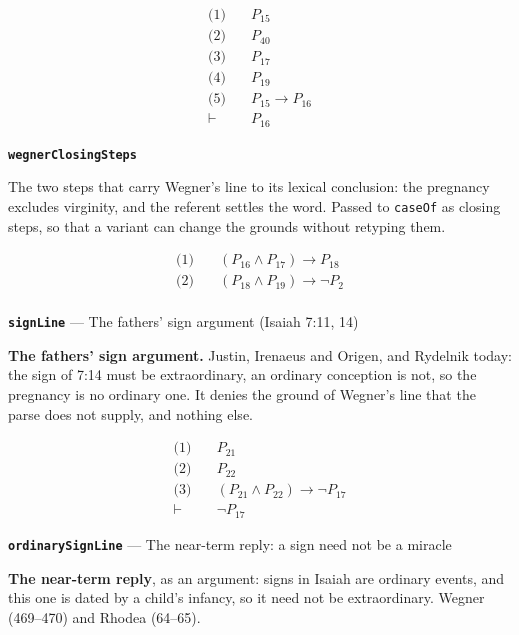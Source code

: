 \documentclass[11pt]{article}
\begin{document}
\begin{align*}
  \text{(1)} \quad & P_{15} \\
  \text{(2)} \quad & P_{40} \\
  \text{(3)} \quad & P_{17} \\
  \text{(4)} \quad & P_{19} \\
  \text{(5)} \quad & P_{15} \rightarrow P_{16} \\
  \vdash \quad & P_{16}
\end{align*}
\par\medskip\noindent\textbf{\texttt{wegner\allowbreak{}Closing\allowbreak{}Steps}}\par\nobreak\noindent
The two steps that carry Wegner's line to its lexical conclusion: the pregnancy excludes virginity, and the referent settles the word. Passed to \texttt{case\allowbreak{}Of} as closing steps, so that a variant can change the grounds without retyping them.

\begin{align*}
  \text{(1)} \quad & (P_{16} \land P_{17}) \rightarrow P_{18} \\
  \text{(2)} \quad & (P_{18} \land P_{19}) \rightarrow \lnot P_{2} \\
\end{align*}
\par\medskip\noindent\textbf{\texttt{sign\allowbreak{}Line}} --- The fathers' sign argument (Isaiah 7:11, 14)\par\nobreak\noindent
\textbf{The fathers' sign argument.} Justin, Irenaeus and Origen, and Rydelnik today: the sign of 7:14 must be extraordinary, an ordinary conception is not, so the pregnancy is no ordinary one. It denies the ground of Wegner's line that the parse does not supply, and nothing else.

\begin{align*}
  \text{(1)} \quad & P_{21} \\
  \text{(2)} \quad & P_{22} \\
  \text{(3)} \quad & (P_{21} \land P_{22}) \rightarrow \lnot P_{17} \\
  \vdash \quad & \lnot P_{17}
\end{align*}
\par\medskip\noindent\textbf{\texttt{ordinary\allowbreak{}Sign\allowbreak{}Line}} --- The near-term reply: a sign need not be a miracle\par\nobreak\noindent
\textbf{The near-term reply}, as an argument: signs in Isaiah are ordinary events, and this one is dated by a child's infancy, so it need not be extraordinary. Wegner (469–470) and Rhodea (64–65).
\end{document}
